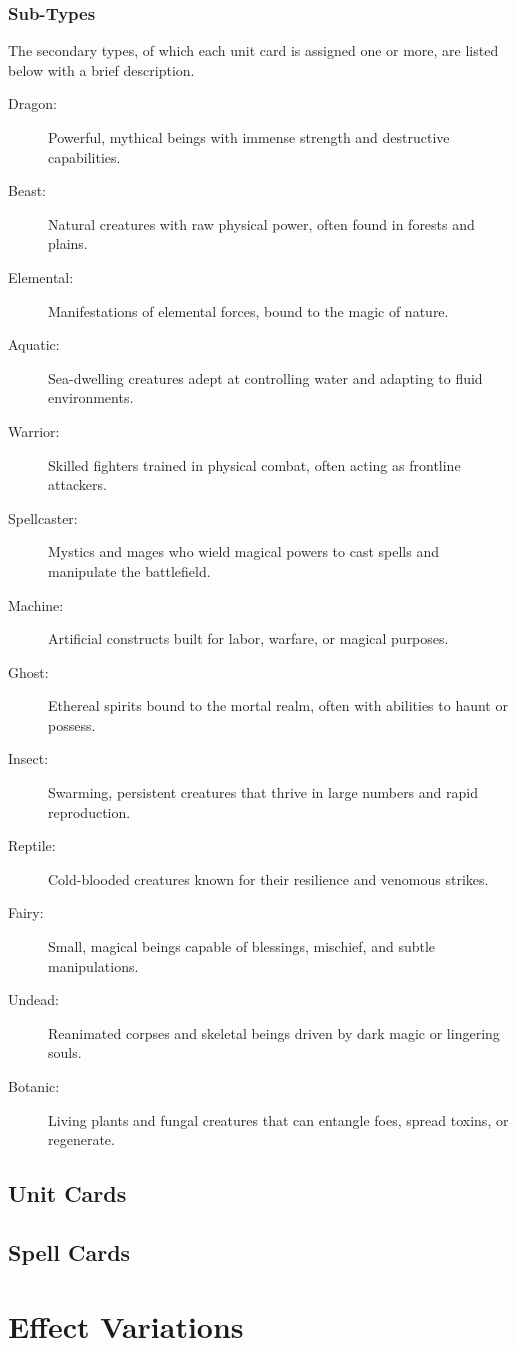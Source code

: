 \subsubsection{Sub-Types}
The secondary types, of which each unit card is assigned one or more, are listed below with a brief description.
\begin{description}
  \item[Dragon:] Powerful, mythical beings with immense strength and destructive capabilities.
  \item[Beast:] Natural creatures with raw physical power, often found in forests and plains.
  \item[Elemental:] Manifestations of elemental forces, bound to the magic of nature.
  \item[Aquatic:] Sea-dwelling creatures adept at controlling water and adapting to fluid environments.
  \item[Warrior:] Skilled fighters trained in physical combat, often acting as frontline attackers.
  \item[Spellcaster:] Mystics and mages who wield magical powers to cast spells and manipulate the battlefield.
  \item[Machine:] Artificial constructs built for labor, warfare, or magical purposes.
  \item[Ghost:] Ethereal spirits bound to the mortal realm, often with abilities to haunt or possess.
  \item[Insect:] Swarming, persistent creatures that thrive in large numbers and rapid reproduction.
  \item[Reptile:] Cold-blooded creatures known for their resilience and venomous strikes.
  \item[Fairy:] Small, magical beings capable of blessings, mischief, and subtle manipulations.
  \item[Undead:] Reanimated corpses and skeletal beings driven by dark magic or lingering souls.
  \item[Botanic:] Living plants and fungal creatures that can entangle foes, spread toxins, or regenerate.
\end{description}





\subsection{Unit Cards}




\subsection{Spell Cards}









\section{Effect Variations}
